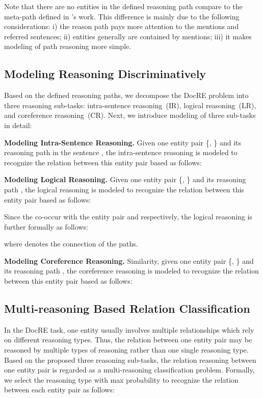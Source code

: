 \documentclass[11pt,a4paper]{article}
\begin{document}
Note that there are no entities in the defined reasoning path compare to the meta-path defined in \citeauthor{docred-rec}'s work.
This difference is mainly due to the following considerations: i) the reason path pays more attention to the mentions and referred sentences; ii) entities generally are contained by mentions; iii) it makes modeling of path reasoning more simple.

\subsection{Modeling Reasoning Discriminatively}
\label{sec2-2}
Based on the defined reasoning paths, we decompose the DocRE problem into three reasoning sub-tasks: intra-sentence reasoning~(IR), logical reasoning~(LR), and coreference reasoning~(CR).
Next, we introduce modeling of three sub-tasks in detail:

\noindent\textbf{Modeling Intra-Sentence Reasoning.}
Given one entity pair \{, \} and its reasoning path  in the sentence , the intra-sentence reasoning is modeled to recognize the relation between this entity pair based as follows:


\noindent\textbf{Modeling Logical Reasoning.}
Given one entity pair \{, \} and its reasoning path , the logical reasoning is modeled to recognize the relation between this entity pair based as follows:

Since the  co-occur with the entity pair  and  respectively, the logical reasoning is further formally as follows:

where  denotes the connection of the paths.

\noindent\textbf{Modeling Coreference Reasoning.}
Similarity, given one entity pair \{, \} and its reasoning path , the coreference reasoning is modeled to recognize the relation between this entity pair based as follows:


\subsection{Multi-reasoning Based Relation Classification}
\label{sec2-3}
In the DocRE task, one entity usually involves multiple relationships which rely on different reasoning types.
Thus, the relation between one entity pair may be reasoned by multiple types of reasoning rather than one single reasoning type.
Based on the proposed three reasoning sub-tasks, the relation reasoning between one entity pair is regarded as a multi-reasoning classification problem.
Formally, we select the reasoning type with max probability to recognize the relation between each entity pair as follows:
\end{document}
